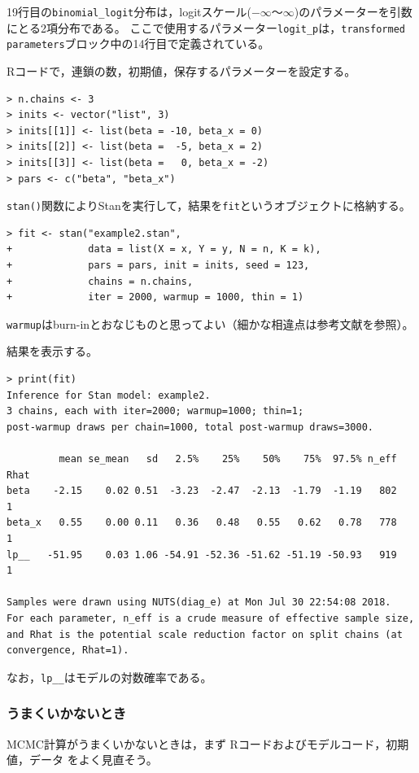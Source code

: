 \documentclass[11pt,uplatex]{jsarticle}
\begin{document}
19行目の\texttt{binomial\_logit}分布は，logitスケール($-\infty$〜$\infty$)のパラメーターを引数にとる2項分布である。
ここで使用するパラメーター\texttt{logit\_p}は，\texttt{transformed parameters}ブロック中の14行目で定義されている。

\textsf{R}コードで，連鎖の数，初期値，保存するパラメーターを設定する。
\begin{lstlisting}
> n.chains <- 3
> inits <- vector("list", 3)
> inits[[1]] <- list(beta = -10, beta_x = 0)
> inits[[2]] <- list(beta =  -5, beta_x = 2)
> inits[[3]] <- list(beta =   0, beta_x = -2)
> pars <- c("beta", "beta_x")
\end{lstlisting}

\texttt{stan()}関数により\textsf{Stan}を実行して，結果を\texttt{fit}というオブジェクトに格納する。
\begin{lstlisting}
> fit <- stan("example2.stan",
+             data = list(X = x, Y = y, N = n, K = k),
+             pars = pars, init = inits, seed = 123,
+             chains = n.chains,
+             iter = 2000, warmup = 1000, thin = 1)
\end{lstlisting}
\noindent
\texttt{warmup}はburn-inとおなじものと思ってよい（細かな相違点は参考文献\cite{BDA3}を参照）。

結果を表示する。
\begin{lstlisting}[basicstyle=\ttfamily\footnotesize]
> print(fit)
Inference for Stan model: example2.
3 chains, each with iter=2000; warmup=1000; thin=1; 
post-warmup draws per chain=1000, total post-warmup draws=3000.

         mean se_mean   sd   2.5%    25%    50%    75%  97.5% n_eff Rhat
beta    -2.15    0.02 0.51  -3.23  -2.47  -2.13  -1.79  -1.19   802    1
beta_x   0.55    0.00 0.11   0.36   0.48   0.55   0.62   0.78   778    1
lp__   -51.95    0.03 1.06 -54.91 -52.36 -51.62 -51.19 -50.93   919    1

Samples were drawn using NUTS(diag_e) at Mon Jul 30 22:54:08 2018.
For each parameter, n_eff is a crude measure of effective sample size,
and Rhat is the potential scale reduction factor on split chains (at 
convergence, Rhat=1).
\end{lstlisting}
\noindent
なお，\texttt{lp\_\_}はモデルの対数確率である。

\subsubsection{うまくいかないとき}
MCMC計算がうまくいかないときは，まず \textsf{R}コードおよびモデルコード，初期値，データ
をよく見直そう。
\end{document}
